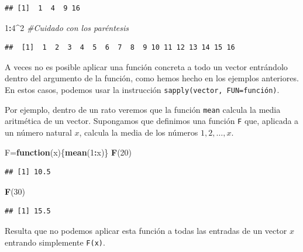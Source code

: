 \documentclass[]{book}
\newenvironment{Shaded}{\begin{snugshade}}{\end{snugshade}}
\newcommand{\CommentTok}[1]{\textcolor[rgb]{0.56,0.35,0.01}{\textit{#1}}}
\newcommand{\ControlFlowTok}[1]{\textcolor[rgb]{0.13,0.29,0.53}{\textbf{#1}}}
\newcommand{\DecValTok}[1]{\textcolor[rgb]{0.00,0.00,0.81}{#1}}
\newcommand{\KeywordTok}[1]{\textcolor[rgb]{0.13,0.29,0.53}{\textbf{#1}}}
\newcommand{\NormalTok}[1]{#1}
\newcommand{\OperatorTok}[1]{\textcolor[rgb]{0.81,0.36,0.00}{\textbf{#1}}}
\theoremstyle{definition}
\theoremstyle{definition}
\theoremstyle{definition}
\theoremstyle{remark}
\begin{document}
\begin{verbatim}
## [1]  1  4  9 16
\end{verbatim}

\begin{Shaded}
\begin{Highlighting}[]
\DecValTok{1}\OperatorTok{:}\DecValTok{4}\OperatorTok{^}\DecValTok{2} \CommentTok{#Cuidado con los paréntesis}
\end{Highlighting}
\end{Shaded}

\begin{verbatim}
##  [1]  1  2  3  4  5  6  7  8  9 10 11 12 13 14 15 16
\end{verbatim}

A veces no es posible aplicar una función concreta a todo un vector entrándolo dentro del argumento de la función, como hemos hecho en los ejemplos anteriores. En estos casos, podemos usar la instrucción \texttt{sapply(vector,\ FUN=función)}.

Por ejemplo, dentro de un rato veremos que la función \texttt{mean} calcula la media aritmética de un vector. Supongamos que definimos una función \texttt{F} que, aplicada a un número natural \(x\), calcula la media de los números
\(1,2,\ldots,x\).

\begin{Shaded}
\begin{Highlighting}[]
\NormalTok{F=}\ControlFlowTok{function}\NormalTok{(x)\{}\KeywordTok{mean}\NormalTok{(}\DecValTok{1}\OperatorTok{:}\NormalTok{x)\}}
\KeywordTok{F}\NormalTok{(}\DecValTok{20}\NormalTok{)}
\end{Highlighting}
\end{Shaded}

\begin{verbatim}
## [1] 10.5
\end{verbatim}

\begin{Shaded}
\begin{Highlighting}[]
\KeywordTok{F}\NormalTok{(}\DecValTok{30}\NormalTok{)}
\end{Highlighting}
\end{Shaded}

\begin{verbatim}
## [1] 15.5
\end{verbatim}

Resulta que no podemos aplicar esta función a todas las entradas de un vector \(x\) entrando simplemente \texttt{F(x)}.
\end{document}
